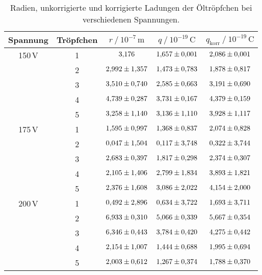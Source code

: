 \begin{table}[H]
    \centering
    \caption{Radien, unkorrigierte und korrigierte Ladungen der Öltröpfchen bei verschiedenen Spannungen.}
    \label{tab:r,q,q_korr}
    \begin{tabular}{S S S S S}
        \toprule
        {Spannung} & {Tröpfchen} & {$r \mathbin{/} 10^{-7}\,\unit{\metre}$} %
        & {$q \mathbin{/} 10^{-19}\,\unit{\coulomb}$} & {$q_{\text{korr}} \mathbin{/} 10^{-19}\,\unit{\coulomb}$}\\
        \midrule
        {150\,V}    & 1 &   $\num{3.176+-0.000}$ & $\num{1.657+-0.001}$ & $\num{2.086+-0.001}$\\
        {}          & 2 &   $\num{2.992+-1.357}$ & $\num{1.473+-0.783}$ & $\num{1.878+-0.817}$\\   
        {}          & 3 &   $\num{3.510+-0.740}$ & $\num{2.585+-0.663}$ & $\num{3.191+-0.690}$\\ 
        {}          & 4 &   $\num{4.739+-0.287}$ & $\num{3.731+-0.167}$ & $\num{4.379+-0.159}$\\ 
        {}          & 5 &   $\num{3.258+-1.140}$ & $\num{3.136+-1.110}$ & $\num{3.928+-1.117}$\\
        {175\,V}    & 1 &   $\num{1.595+-0.997}$ & $\num{1.368+-0.837}$ & $\num{2.074+-0.828}$\\   
        {}          & 2 &   $\num{0.047+-1.504}$ & $\num{0.117+-3.748}$ & $\num{0.322+-3.744}$\\
        {}          & 3 &   $\num{2.683+-0.397}$ & $\num{1.817+-0.298}$ & $\num{2.374+-0.307}$\\
        {}          & 4 &   $\num{2.105+-1.406}$ & $\num{2.799+-1.834}$ & $\num{3.893+-1.821}$\\
        {}          & 5 &   $\num{2.376+-1.608}$ & $\num{3.086+-2.022}$ & $\num{4.154+-2.000}$\\
        {200\,V}    & 1 &   $\num{0.492+-2.896}$ & $\num{0.634+-3.722}$ & $\num{1.693+-3.711}$\\
        {}          & 2 &   $\num{6.933+-0.310}$ & $\num{5.066+-0.339}$ & $\num{5.667+-0.354}$\\
        {}          & 3 &   $\num{6.346+-0.443}$ & $\num{3.784+-0.420}$ & $\num{4.275+-0.442}$\\
        {}          & 4 &   $\num{2.154+-1.007}$ & $\num{1.444+-0.688}$ & $\num{1.995+-0.694}$\\
        {}          & 5 &   $\num{2.003+-0.612}$ & $\num{1.267+-0.374}$ & $\num{1.788+-0.370}$\\

\end{tabular}
\end{table}
